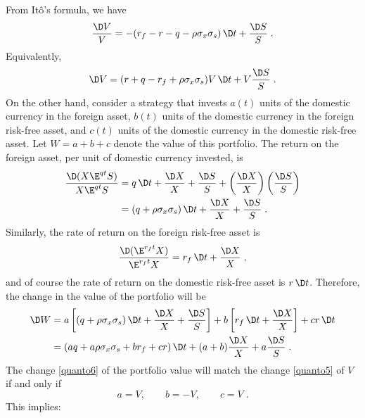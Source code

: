 From It\^o's formula, we have
\begin{equation}\label{quanto21}
\frac{\D V}{V} = -(r_f - r-q-\rho\sigma_x\sigma_s)\,\D t + \frac{\D S}{S}\;.
\end{equation}
Equivalently,
\begin{equation}\label{quanto5}
\D V =(r+q-r_f+\rho\sigma_x\sigma_s)V\,\D t + V\frac{\D S}{S}\;.
\end{equation}
On the other hand, consider a strategy that invests $a(t)$ units of the domestic currency in the foreign asset, $b(t)$ units of the domestic currency in the foreign risk-free asset, and $c(t)$ units of the domestic currency in the domestic risk-free asset.  Let $W=a+b+c$ denote the value of this portfolio.  The return on the foreign asset, per unit of domestic currency invested, is
\begin{align}
\frac{\D (X\E^{qt}S)}{X\E^{qt}S} &= q\,\D t+\frac{\D X}{X} + \frac{\D S}{S} + \left(\frac{\D X}{X} \right)\left( \frac{\D S}{S}\right) \notag\\
&= (q+\rho\sigma_x\sigma_s)\,\D t+\frac{\D X}{X} + \frac{\D S}{S}\;.\label{quanto200}
\end{align}
Similarly, the rate of return on the foreign risk-free asset is
\begin{equation}\label{quanto300}
\frac{\D (\E^{r_ft}X)}{\E^{r_ft}X} = r_f\,\D t + \frac{\D X}{X}\;,
\end{equation}
and of course the rate of return on the domestic risk-free asset is $r\,\D t$.  Therefore, the change in the value of the portfolio will be
\begin{align}
\D W &= a\left[(q+\rho\sigma_x\sigma_s)\,\D t+\frac{\D X}{X} + \frac{\D S}{S}\right] + b\left[r_f\,\D t + \frac{\D X}{X}\right] + cr\,\D t\notag\\
&=( aq+a\rho\sigma_x\sigma_s + br_f+cr)\,\D t +  (a+b)\frac{\D X}{X} +a \frac{\D S}{S}\; .\label{quanto6}
\end{align}
The change \eqref{quanto6} of the portfolio value will match the change \eqref{quanto5} of $V$ if and only if
\begin{equation}\label{quanto7}
a= V, \qquad b= -V, \qquad c = V\;.
\end{equation}
This implies:

